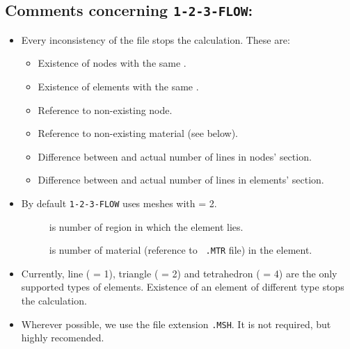 \subsection*{Comments concerning {\tt 1-2-3-FLOW}:}
\begin{itemize}
  \item Every inconsistency of the file stops the calculation.
    These are:
      \begin{itemize}
        \item Existence of nodes with the same .
        \item Existence of elements with the same .
        \item Reference to non-existing node.
        \item Reference to non-existing material (see below).
        \item Difference between  and actual number of
          lines in nodes' section.
        \item Difference between  and actual number of
          lines in elements' section.
      \end{itemize}
  \item By default {\tt 1-2-3-FLOW} uses meshes with  = 2.
    \begin{description}
    \item[] is number of region in which the element lies. 
    \item[] is number of material (reference to {\tt
    .MTR} file) in the element.
    \end{description}
  \item Currently, line ( = 1), triangle ( = 2) and
    tetrahedron ( = 4) are the only supported types
    of elements. Existence of an element of different type stops the calculation.
  \item Wherever possible, we use the file extension {\tt .MSH}. It is not
    required, but highly recomended.
\end{itemize}



